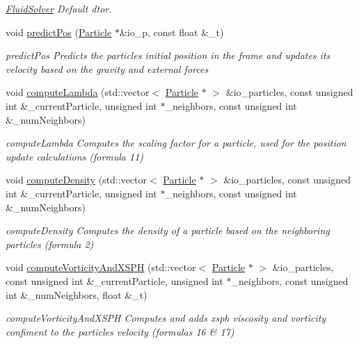 \begin{DoxyCompactItemize}
\begin{DoxyCompactList}\small\item\em \hyperlink{classFluidSolver}{Fluid\+Solver} Default dtor. \end{DoxyCompactList}\item 
void \hyperlink{classFluidSolver_a0f166fa79f22dfd64609a115f94cfa80}{predict\+Pos} (\hyperlink{structParticle}{Particle} $\ast$\&io\+\_\+p, const float \&\+\_\+t)
\begin{DoxyCompactList}\small\item\em predict\+Pos Predicts the particle\textquotesingle{}s initial position in the frame and updates its velocity based on the gravity and external forces \end{DoxyCompactList}\item 
void \hyperlink{classFluidSolver_a9c7642bcd69afed7b9f324a77211500f}{compute\+Lambda} (std\+::vector$<$ \hyperlink{structParticle}{Particle} $\ast$ $>$ \&io\+\_\+particles, const unsigned int \&\+\_\+current\+Particle, unsigned int $\ast$\+\_\+neighbors, const unsigned int \&\+\_\+num\+Neighbors)
\begin{DoxyCompactList}\small\item\em compute\+Lambda Computes the scaling factor for a particle, used for the position update calculations (formula 11) \end{DoxyCompactList}\item 
void \hyperlink{classFluidSolver_a45ad268c542e07870828e44f26543f5c}{compute\+Density} (std\+::vector$<$ \hyperlink{structParticle}{Particle} $\ast$ $>$ \&io\+\_\+particles, const unsigned int \&\+\_\+current\+Particle, unsigned int $\ast$\+\_\+neighbors, const unsigned int \&\+\_\+num\+Neighbors)
\begin{DoxyCompactList}\small\item\em compute\+Density Computes the density of a particle based on the neighboring particles (formula 2) \end{DoxyCompactList}\item 
void \hyperlink{classFluidSolver_ab7568d71071d2623c1d25a9a8f745c50}{compute\+Vorticity\+And\+X\+S\+PH} (std\+::vector$<$ \hyperlink{structParticle}{Particle} $\ast$ $>$ \&io\+\_\+particles, const unsigned int \&\+\_\+current\+Particle, unsigned int $\ast$\+\_\+neighbors, const unsigned int \&\+\_\+num\+Neighbors, float \&\+\_\+t)
\begin{DoxyCompactList}\small\item\em compute\+Vorticity\+And\+X\+S\+PH Computes and adds xsph viscosity and vorticity confiment to the particles velocity (formulas 16 \& 17) \end{DoxyCompactList}\item 

\end{DoxyCompactItemize}
